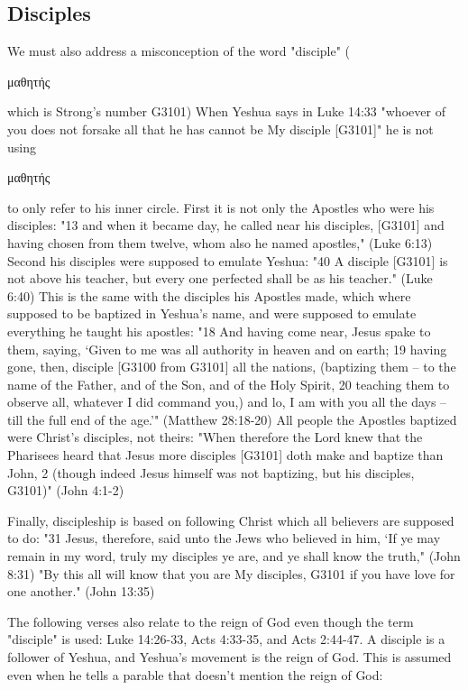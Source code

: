 \documentclass[11pt]{article}
\begin{document}
\subsection{Disciples}
We must also address a misconception of the word "disciple" (\begin{greek}μαθητής\end{greek} which is Strong's number G3101) When Yeshua says in Luke 14:33 "whoever of you does not forsake all that he has cannot be My disciple [G3101]" he is not using \begin{greek}μαθητής\end{greek} to only refer to his inner circle. First it is not only the Apostles who were his disciples: "13 and when it became day, he called near his disciples, [G3101] and having chosen from them twelve, whom also he named apostles," (Luke 6:13) Second his disciples were supposed to emulate Yeshua: "40 A disciple [G3101] is not above his teacher, but every one perfected shall be as his teacher." (Luke 6:40)
This is the same with the disciples his Apostles made, which where supposed to be baptized in Yeshua's name, and were supposed to emulate everything he taught his apostles: 
"18 And having come near, Jesus spake to them, saying, `Given to me was all authority in heaven and on earth;
19 having gone, then, disciple [G3100 from G3101] all the nations, (baptizing them -- to the name of the Father, and of the Son, and of the Holy Spirit,
20 teaching them to observe all, whatever I did command you,) and lo, I am with you all the days -- till the full end of the age.'" (Matthew 28:18-20) All people the Apostles baptized were Christ's disciples, not theirs: "When therefore the Lord knew that the Pharisees heard that Jesus more disciples [G3101] doth make and baptize than John, 2 (though indeed Jesus himself was not baptizing, but his disciples, G3101)" (John 4:1-2) 

Finally, discipleship is based on following Christ which all believers are supposed to do: "31 Jesus, therefore, said unto the Jews who believed in him, `If ye may remain in my word, truly my disciples ye are, and ye shall know the truth," (John 8:31) "By this all will know that you are My disciples, G3101 if you have love for one another." 
(John 13:35)

The following verses also relate to the reign of God even though the term "disciple" is used: Luke 14:26-33, Acts 4:33-35, and Acts 2:44-47. A disciple is a follower of Yeshua, and Yeshua's movement is the reign of God. This is assumed even when he tells a parable that doesn't mention the reign of God:
\end{document}
